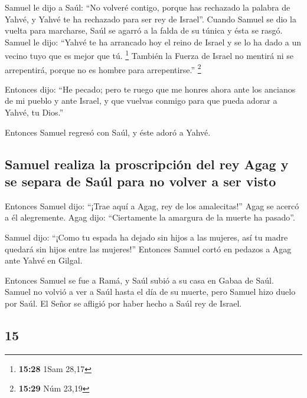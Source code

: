 \begin{paracol}{2}
 Samuel le dijo a Saúl: ``No volveré contigo, porque has
rechazado la palabra de Yahvé, y Yahvé te ha rechazado para ser rey de
Israel''.  Cuando Samuel se dio la vuelta para marcharse,
Saúl se agarró a la falda de su túnica y ésta se rasgó. 
Samuel le dijo: ``Yahvé te ha arrancado hoy el reino de Israel y se lo
ha dado a un vecino tuyo que es mejor que tú. \footnote{\textbf{15:28}
  1Sam 28,17}  También la Fuerza de Israel no mentirá ni
se arrepentirá, porque no es hombre para arrepentirse.'' \footnote{\textbf{15:29}
  Núm 23,19}

 Entonces dijo: ``He pecado; pero te ruego que me honres
ahora ante los ancianos de mi pueblo y ante Israel, y que vuelvas
conmigo para que pueda adorar a Yahvé, tu Dios.''

 Entonces Samuel regresó con Saúl, y éste adoró a Yahvé.

\hypertarget{samuel-realiza-la-proscripciuxf3n-del-rey-agag-y-se-separa-de-sauxfal-para-no-volver-a-ser-visto}{%
\subsection{Samuel realiza la proscripción del rey Agag y se separa de
Saúl para no volver a ser
visto}\label{samuel-realiza-la-proscripciuxf3n-del-rey-agag-y-se-separa-de-sauxfal-para-no-volver-a-ser-visto}}

 Entonces Samuel dijo: ``¡Trae aquí a Agag, rey de los
amalecitas!'' Agag se acercó a él alegremente. Agag dijo: ``Ciertamente
la amargura de la muerte ha pasado''.

 Samuel dijo: ``¡Como tu espada ha dejado sin hijos a las
mujeres, así tu madre quedará sin hijos entre las mujeres!'' Entonces
Samuel cortó en pedazos a Agag ante Yahvé en Gilgal.

 Entonces Samuel se fue a Ramá, y Saúl subió a su casa en
Gabaa de Saúl.  Samuel no volvió a ver a Saúl hasta el
día de su muerte, pero Samuel hizo duelo por Saúl. El Señor se afligió
por haber hecho a Saúl rey de Israel.

\switchcolumn
\begin{otherlanguage}{english}

\hypertarget{section-29}{%
\section{15}\label{section-29}}


\end{otherlanguage}
\end{paracol}
